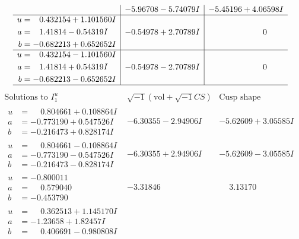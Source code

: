 \documentclass[1p]{elsarticle_modified}
\theoremstyle{definition}
\newcommand{\I}{\sqrt{-1}}
\begin{document}
$$\begin{array}{c|c|c}
 & -5.96708 - 5.74079 I & -5.45196 + 4.06598 I \\ \hline\begin{aligned}
u &= \phantom{-}0.432154 + 1.101560 I \\
a &= \phantom{-}1.41814 - 0.54319 I \\
b &= -0.682213 + 0.652652 I\end{aligned}
 & -0.54978 + 2.70789 I & \phantom{-0.000000 } 0 \\ \hline\begin{aligned}
u &= \phantom{-}0.432154 - 1.101560 I \\
a &= \phantom{-}1.41814 + 0.54319 I \\
b &= -0.682213 - 0.652652 I\end{aligned}
 & -0.54978 - 2.70789 I & \phantom{-0.000000 } 0\\
 \hline 
 \end{array}$$\newpage$$\begin{array}{c|c|c}  
\text{Solutions to }I^u_{1}& \I (\text{vol} + \sqrt{-1}CS) & \text{Cusp shape}\\
 \hline 
\begin{aligned}
u &= \phantom{-}0.804661 + 0.108864 I \\
a &= -0.773190 + 0.547526 I \\
b &= -0.216473 + 0.828174 I\end{aligned}
 & -6.30355 - 2.94906 I & -5.62609 + 3.05585 I \\ \hline\begin{aligned}
u &= \phantom{-}0.804661 - 0.108864 I \\
a &= -0.773190 - 0.547526 I \\
b &= -0.216473 - 0.828174 I\end{aligned}
 & -6.30355 + 2.94906 I & -5.62609 - 3.05585 I \\ \hline\begin{aligned}
u &= -0.800011\phantom{ +0.000000I} \\
a &= \phantom{-}0.579040\phantom{ +0.000000I} \\
b &= -0.453790\phantom{ +0.000000I}\end{aligned}
 & -3.31846\phantom{ +0.000000I} & \phantom{-}3.13170\phantom{ +0.000000I} \\ \hline\begin{aligned}
u &= \phantom{-}0.362513 + 1.145170 I \\
a &= -1.23658 + 1.82457 I \\
b &= \phantom{-}0.406691 - 0.980808 I\end{aligned}

\end{array}$$
\end{document}

